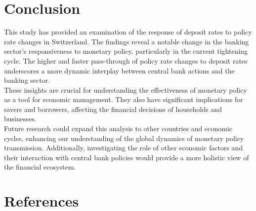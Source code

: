 \documentclass{article}
\begin{document}
\section{Conclusion}

This study has provided an examination of the response of deposit rates to policy rate changes in Switzerland. The findings reveal a notable change in the banking sector's responsiveness to monetary policy, particularly in the current tightening cycle. The higher and faster pass-through of policy rate changes to deposit rates underscores a more dynamic interplay between central bank actions and the banking sector.\\

These insights are crucial for understanding the effectiveness of monetary policy as a tool for economic management. They also have significant implications for savers and borrowers, affecting the financial decisions of households and businesses.\\

Future research could expand this analysis to other countries and economic cycles, enhancing our understanding of the global dynamics of monetary policy transmission. Additionally, investigating the role of other economic factors and their interaction with central bank policies would provide a more holistic view of the financial ecosystem.\\

\newpage  %
\section{References}
\printbibliography[heading=none] 
\end{document}
